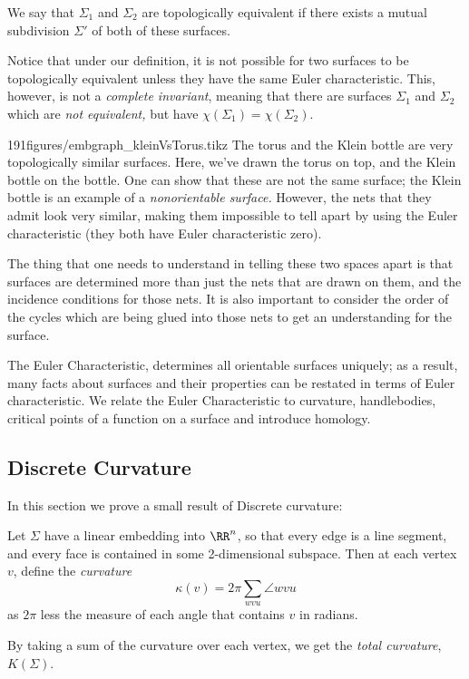 \begin{definition}
We say that $\Sigma_1$ and $\Sigma_2$ are topologically equivalent if there exists a mutual subdivision $\Sigma'$ of both of these surfaces. 
\end{definition}
Notice that under our definition, it is not possible for two surfaces to be topologically equivalent unless they have the same Euler characteristic. This, however, is not a \emph{complete invariant}, meaning that there are surfaces $\Sigma_1$ and $\Sigma_2$ which are \emph{not equivalent,} but have $\chi(\Sigma_1)=\chi(\Sigma_2)$. \\

\begin{examplefigureenv}{191figures/embgraph_kleinVsTorus.tikz}
	The torus and the Klein bottle are very topologically similar surfaces. Here, we've drawn the torus on top, and the Klein bottle on the bottle. One can show that these are not the same surface; the Klein bottle is an example of a \emph{nonorientable surface.} However, the nets that they admit look very similar, making them impossible to tell apart by using the Euler characteristic (they both have Euler characteristic zero).

The thing that one needs to understand in telling these two spaces apart is that surfaces are determined more than just the nets that are drawn on them, and the incidence conditions for those nets. It is also important to consider the order of the cycles which are being glued into those nets to get an understanding for the surface.
\end{examplefigureenv}
\begin{elevator}
The Euler Characteristic, determines all orientable surfaces uniquely; as a result, many facts about surfaces and their properties can be restated in terms of Euler characteristic. We relate the Euler Characteristic to curvature, handlebodies, critical points of a function on a surface and introduce homology. 
\label{sec:planar:euler}
\end{elevator}
\subsection{Discrete Curvature}

In this section we prove a small result of Discrete curvature:
\begin{definition}
Let $\Sigma$ have a linear embedding into $\RR^n$, so that every edge is a line segment, and every face is contained in some 2-dimensional subspace. Then at each vertex $v$, define the \emph{curvature} 
\[\kappa(v)=2\pi \sum_{wvu} \angle wvu\]
as $2\pi$ less the measure of each angle that contains $v$ in radians. 
\end{definition}
By taking a sum of the curvature over each vertex, we get the \emph{total curvature}, $K(\Sigma)$.\\

